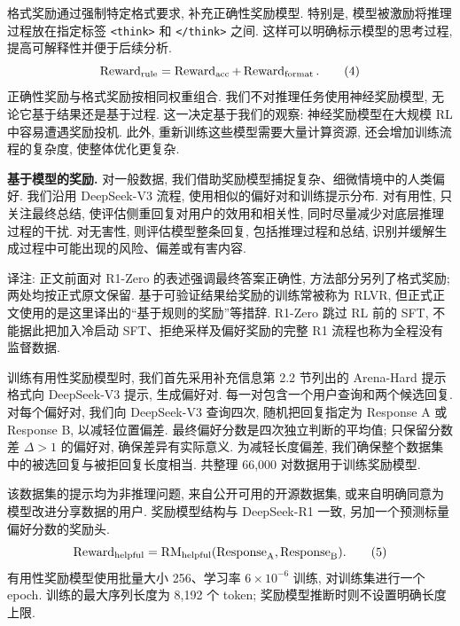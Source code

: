 格式奖励通过强制特定格式要求, 补充正确性奖励模型. 特别是, 模型被激励将推理过程放在指定标签 \texttt{<think>} 和 \texttt{</think>} 之间. 这样可以明确标示模型的思考过程, 提高可解释性并便于后续分析.
\begin{equation}\label{r1n-eq4}
\operatorname{Reward}_{\rm rule}
=\operatorname{Reward}_{\rm acc}+\operatorname{Reward}_{\rm format}.
\tag{4}
\end{equation}
正确性奖励与格式奖励按相同权重组合. 我们不对推理任务使用神经奖励模型, 无论它基于结果还是基于过程. 这一决定基于我们的观察: 神经奖励模型在大规模 RL 中容易遭遇奖励投机. 此外, 重新训练这些模型需要大量计算资源, 还会增加训练流程的复杂度, 使整体优化更复杂.

\noindent\textbf{基于模型的奖励.} 对一般数据, 我们借助奖励模型捕捉复杂、细微情境中的人类偏好. 我们沿用 DeepSeek-V3 流程, 使用相似的偏好对和训练提示分布. 对有用性, 只关注最终总结, 使评估侧重回复对用户的效用和相关性, 同时尽量减少对底层推理过程的干扰. 对无害性, 则评估模型整条回复, 包括推理过程和总结, 识别并缓解生成过程中可能出现的风险、偏差或有害内容.

\begin{remark}
译注: 正文前面对 R1-Zero 的表述强调最终答案正确性, 方法部分另列了格式奖励; 两处均按正式原文保留. 基于可验证结果给奖励的训练常被称为 RLVR, 但正式正文使用的是这里译出的“基于规则的奖励”等措辞. R1-Zero 跳过 RL 前的 SFT, 不能据此把加入冷启动 SFT、拒绝采样及偏好奖励的完整 R1 流程也称为全程没有监督数据.
\end{remark}

\label{r1n-methods-helpful}
训练有用性奖励模型时, 我们首先采用补充信息第 2.2 节列出的 Arena-Hard 提示格式向 DeepSeek-V3 提示, 生成偏好对. 每一对包含一个用户查询和两个候选回复. 对每个偏好对, 我们向 DeepSeek-V3 查询四次, 随机把回复指定为 Response A 或 Response B, 以减轻位置偏差. 最终偏好分数是四次独立判断的平均值; 只保留分数差 $\Delta>1$ 的偏好对, 确保差异有实际意义. 为减轻长度偏差, 我们确保整个数据集中的被选回复与被拒回复长度相当. 共整理 66,000 对数据用于训练奖励模型.

该数据集的提示均为非推理问题, 来自公开可用的开源数据集, 或来自明确同意为模型改进分享数据的用户. 奖励模型结构与 DeepSeek-R1 一致, 另加一个预测标量偏好分数的奖励头.
\begin{equation}\label{r1n-eq5}
\operatorname{Reward}_{\rm helpful}
=\operatorname{RM}_{\rm helpful}(\operatorname{Response}_{\rm A},\operatorname{Response}_{\rm B}).
\tag{5}
\end{equation}
有用性奖励模型使用批量大小 256、学习率 $6\times10^{-6}$ 训练, 对训练集进行一个 epoch. 训练的最大序列长度为 8,192 个 token; 奖励模型推断时则不设置明确长度上限.

